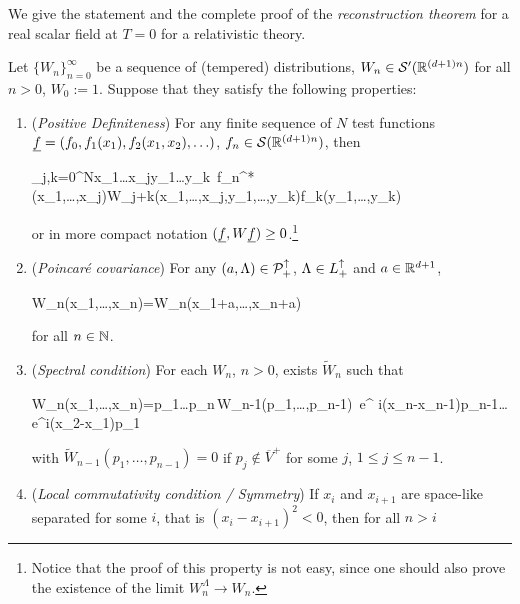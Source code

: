 \documentclass[../main/main.tex]{subfiles}
\begin{document}
We give the statement and the complete proof of the \emph{reconstruction theorem} for a real scalar field at $T=0$ for a relativistic theory.

\begin{theorem}
	Let $\{W_n\}_{n=0}^\infty$ be a sequence of (tempered) distributions, $W_n\in\mathcal S'(\mathbb{R}^{(d+1)n})$ for all $n>0$, $W_0:=1$. Suppose that they satisfy the following properties:
	\begin{enumerate}[label=(\arabic*)]
		\item (\emph{Positive Definiteness}) For any finite sequence of $N$ test functions $\uf=(f_0,f_1(x_1),f_2(x_1,x_2),\ldots)$, $f_n\in\mathcal S(\mathbb{R}^{(d+1)n})$, then
		\begin{eq}
			\sum_{j,k=0}^N\int\de x_1\ldots\de x_j\de y_1\ldots\de y_k \,f_n^*(x_1,\ldots,x_j)W_{j+k}(x_1,\ldots,x_j,y_1,\ldots,y_k)f_k(y_1,\ldots,y_k)
		\end{eq}
		or in more compact notation $(\uf,W\uf)\geq0$.\footnote{Notice that the proof of this property is not easy, since one should also prove the existence of the limit $W_n^\Lambda\to W_n$.} 
		\item (\emph{Poincaré covariance}) For any $(a,\Lambda)\in\mathcal P_+^\uparrow$, $\Lambda\in L_+^\uparrow$ and $a\in\mathbb{R}^{d+1}$, 
		\begin{eq}
			W_n(x_1,\ldots,x_n)=W_n(\Lambda x_1+a,\ldots,\Lambda x_n+a)
		\end{eq}
		for all $n\in\mathbb{N}$.
		\item (\emph{Spectral condition}) For each $W_n$, $n>0$, exists $\widetilde W_n$ such that
		\begin{eq}\label{eq:reconstr_thm_hp_3}
			W_n(x_1,\ldots,x_n)=\int\de p_1\ldots\de p_n\,\widetilde W_{n-1}(p_1,\ldots,p_{n-1})\, e^{ i(x_n-x_{n-1})p_{n-1}}\ldots e^{i(x_2-x_1)p_1}
		\end{eq}
		with $\widetilde W_{n-1}(p_1,\ldots,p_{n-1})=0$ if $p_j\not\in \overline V^+$ for some $j$, $1\leq j\leq n-1$. 
		\item (\emph{Local commutativity condition / Symmetry}) If $x_i$ and $x_{i+1}$ are space-like separated for some $i$, that is $(x_i-x_{i+1})^2<0$, then for all $n>i$

\end{enumerate}
\end{theorem}
\end{document}
